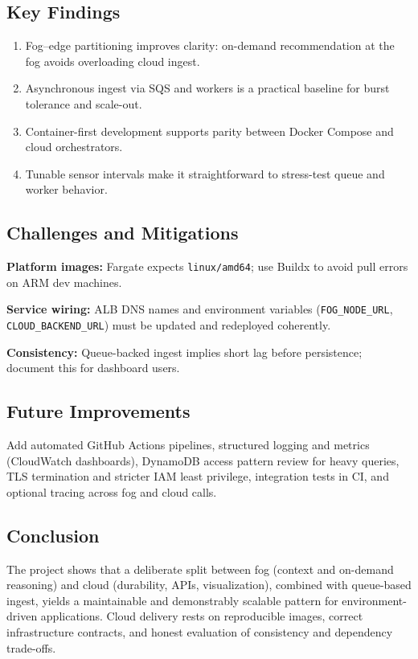 \documentclass[conference]{IEEEtran}
\begin{document}
\subsection{Key Findings}
\begin{enumerate}
  \item Fog--edge partitioning improves clarity: on-demand recommendation at the fog avoids overloading cloud ingest.
  \item Asynchronous ingest via SQS and workers is a practical baseline for burst tolerance and scale-out.
  \item Container-first development supports parity between Docker Compose and cloud orchestrators.
  \item Tunable sensor intervals make it straightforward to stress-test queue and worker behavior.
\end{enumerate}

\subsection{Challenges and Mitigations}
\textbf{Platform images:} Fargate expects \texttt{linux/amd64}; use Buildx to avoid pull errors on ARM dev machines.

\textbf{Service wiring:} ALB DNS names and environment variables (\texttt{FOG\_NODE\_URL}, \texttt{CLOUD\_BACKEND\_URL}) must be updated and redeployed coherently.

\textbf{Consistency:} Queue-backed ingest implies short lag before persistence; document this for dashboard users.

\subsection{Future Improvements}
Add automated GitHub Actions pipelines, structured logging and metrics (CloudWatch dashboards), DynamoDB access pattern review for heavy queries, TLS termination and stricter IAM least privilege, integration tests in CI, and optional tracing across fog and cloud calls.

\subsection{Conclusion}
The project shows that a deliberate split between fog (context and on-demand reasoning) and cloud (durability, APIs, visualization), combined with queue-based ingest, yields a maintainable and demonstrably scalable pattern for environment-driven applications. Cloud delivery rests on reproducible images, correct infrastructure contracts, and honest evaluation of consistency and dependency trade-offs.
\end{document}
